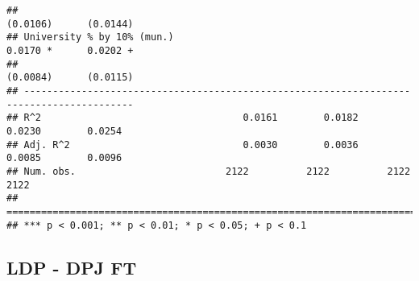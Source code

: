 \documentclass[
]{article}
\begin{document}
\begin{verbatim}
##                                                                  (0.0106)      (0.0144)  
## University % by 10% (mun.)                                        0.0170 *      0.0202 + 
##                                                                  (0.0084)      (0.0115)  
## -----------------------------------------------------------------------------------------
## R^2                                   0.0161        0.0182        0.0230        0.0254   
## Adj. R^2                              0.0030        0.0036        0.0085        0.0096   
## Num. obs.                          2122          2122          2122          2122        
## =========================================================================================
## *** p < 0.001; ** p < 0.01; * p < 0.05; + p < 0.1
\end{verbatim}

\hypertarget{ldp---dpj-ft-2}{%
\subsection{LDP - DPJ FT}\label{ldp---dpj-ft-2}}
\end{document}
